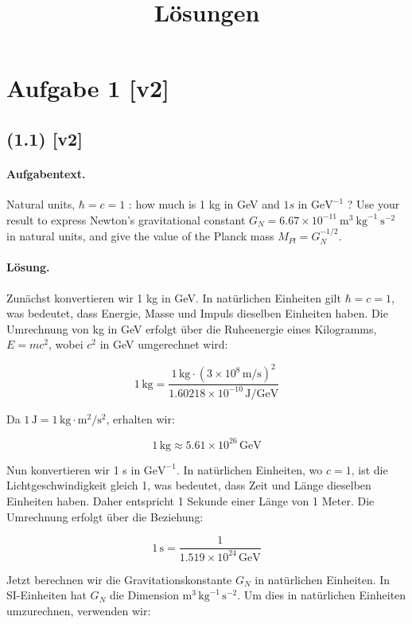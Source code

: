 \documentclass[11pt,a4paper]{article}
\title{Lösungen}
\date{}
\begin{document}
\maketitle

\section*{Aufgabe 1 [v2]}
\subsection*{(1.1) [v2]}
\paragraph{Aufgabentext.}
Natural units, $\hbar=c=1$ : how much is 1 kg in GeV and $1 s$ in $\mathrm{GeV}^{-1}$ ? Use your result to express Newton's gravitational constant $G_N=6.67 \times 10^{-11} \mathrm{~m}^3 \mathrm{~kg}^{-1} \mathrm{~s}^{-2}$ in natural units, and give the value of the Planck mass $M_{P l}=G_N^{-1 / 2}$.

\paragraph{Lösung.}
Zunächst konvertieren wir 1 kg in GeV. In natürlichen Einheiten gilt $\hbar = c = 1$, was bedeutet, dass Energie, Masse und Impuls dieselben Einheiten haben. Die Umrechnung von kg in GeV erfolgt über die Ruheenergie eines Kilogramms, $E = mc^2$, wobei $c^2$ in GeV umgerechnet wird:

\[
1 \, \text{kg} = \frac{1 \, \text{kg} \cdot (3 \times 10^8 \, \text{m/s})^2}{1.60218 \times 10^{-10} \, \text{J/GeV}}
\]

Da $1 \, \text{J} = 1 \, \text{kg} \cdot \text{m}^2/\text{s}^2$, erhalten wir:

\[
1 \, \text{kg} \approx 5.61 \times 10^{26} \, \text{GeV}
\]

Nun konvertieren wir 1 s in $\mathrm{GeV}^{-1}$. In natürlichen Einheiten, wo $c = 1$, ist die Lichtgeschwindigkeit gleich 1, was bedeutet, dass Zeit und Länge dieselben Einheiten haben. Daher entspricht 1 Sekunde einer Länge von 1 Meter. Die Umrechnung erfolgt über die Beziehung:

\[
1 \, \text{s} = \frac{1}{1.519 \times 10^{24} \, \text{GeV}}
\]

Jetzt berechnen wir die Gravitationskonstante $G_N$ in natürlichen Einheiten. In SI-Einheiten hat $G_N$ die Dimension $\mathrm{m}^3 \, \mathrm{kg}^{-1} \, \mathrm{s}^{-2}$. Um dies in natürlichen Einheiten umzurechnen, verwenden wir:
\end{document}
